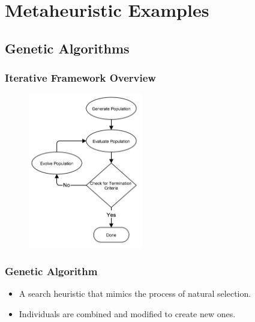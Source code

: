 \documentclass{beamer}
\begin{document}
\section{Metaheuristic Examples}
\subsection{Genetic Algorithms}

\begin{frame}

	\frametitle{Iterative Framework Overview}

	\begin{figure}
		\includegraphics[width=50mm]{resources/general_flowchart.jpg}
	\end{figure}

\end{frame}

\begin{frame}

	\frametitle{Genetic Algorithm}

	\begin{itemize}
		\item A search heuristic that mimics the process of natural selection.
		\item Individuals are combined and modified to create new ones.
	\end{itemize}

\end{frame}
\end{document}
